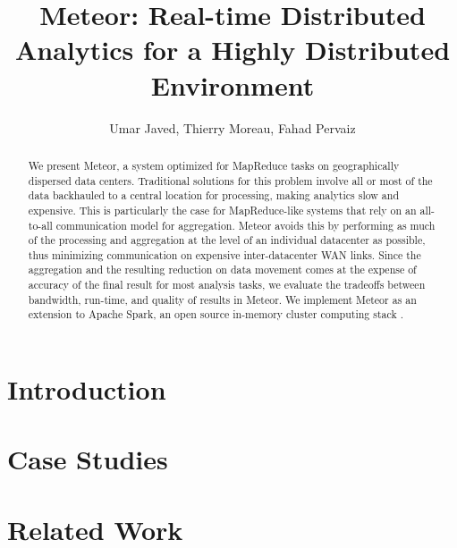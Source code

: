 \documentclass{article}
\begin{document}
\title{Meteor: Real-time Distributed Analytics for a Highly Distributed Environment
}
\author{Umar Javed, Thierry Moreau, Fahad Pervaiz}

\maketitle

\begin{abstract}
We present Meteor, a system optimized for MapReduce tasks on geographically dispersed 
data centers. Traditional solutions for this problem involve all or most of the data backhauled to a central location for processing, making analytics slow and expensive. This is particularly the case for MapReduce-like systems that rely on an all-to-all communication model for aggregation. Meteor avoids this by performing as much of the processing and aggregation at the level of an individual datacenter as possible, thus minimizing communication on expensive inter-datacenter WAN links. Since the aggregation and the resulting reduction on data movement comes at the expense of accuracy of the final result for most analysis tasks, we evaluate the tradeoffs between bandwidth, run-time, and quality of results in Meteor. We implement Meteor as an extension to Apache Spark, an open source in-memory cluster computing stack \cite{1}. 
\end{abstract}

\section{Introduction}



\section{Case Studies}



\section{Related Work}





\end{document}
